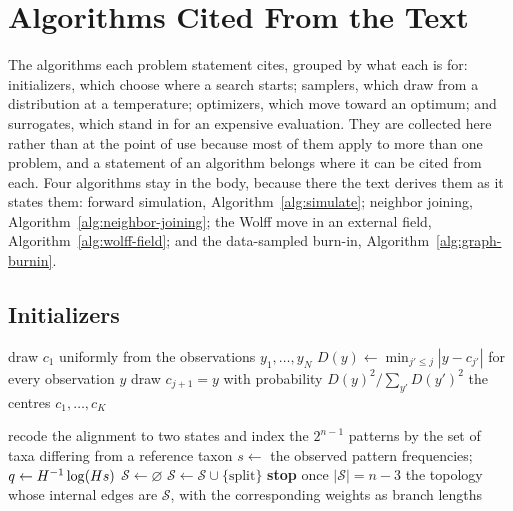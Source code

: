 \documentclass[11pt,a4paper]{article}
\begin{document}
\section{Algorithms Cited From the Text}
\label{app:algorithms}

The algorithms each problem statement cites, grouped by what each is for:
initializers, which choose where a search starts; samplers, which draw from a
distribution at a temperature; optimizers, which move toward an optimum; and
surrogates, which stand in for an expensive evaluation. They are collected
here rather than at the point of use because most of them apply to more than
one problem, and a statement of an algorithm belongs where it can be cited
from each. Four algorithms stay in the body, because there the text derives
them as it states them: forward simulation, Algorithm~\ref{alg:simulate};
neighbor joining, Algorithm~\ref{alg:neighbor-joining}; the Wolff move in an
external field, Algorithm~\ref{alg:wolff-field}; and the data-sampled
burn-in, Algorithm~\ref{alg:graph-burnin}.

\subsection{Initializers}
\label{app:algorithms:initializers}

\begin{algorithm}[htbp]
\caption{$k$-means$++$ seeding of $K$ centres, Equation~\ref{eq:kmeanspp}}
\label{alg:kmeanspp}
\begin{algorithmic}[1]
\State draw $c_1$ uniformly from the observations $y_1, \dots, y_N$
  \State $D(y) \gets \min_{j' \le j} |y - c_{j'}|$ for every observation $y$
  \State draw $c_{j+1} = y$ with probability $D(y)^2 / \sum_{y'} D(y')^2$
\EndFor
\State \Return the centres $c_1, \dots, c_K$
\end{algorithmic}
\end{algorithm}

\begin{algorithm}[htbp]
\caption{The closest tree of a Hadamard spectrum, Equation~\ref{eq:hadamard}}
\label{alg:hadamard-start}
\begin{algorithmic}[1]
\State recode the alignment to two states and index the $2^{n-1}$ patterns by
       the set of taxa differing from a reference taxon
\State $s \gets$ the observed pattern frequencies;
       $q \gets H^{-1} \log(H s)$
\State $\mathcal{S} \gets \varnothing$
    \State $\mathcal{S} \gets \mathcal{S} \cup \{\text{split}\}$
  \EndIf
  \State \textbf{stop} once $|\mathcal{S}| = n - 3$
\EndFor
\State \Return the topology whose internal edges are $\mathcal{S}$, with the
       corresponding weights as branch lengths
\end{algorithmic}
\end{algorithm}
\end{document}
